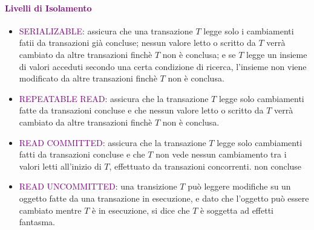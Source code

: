 \paragraph{\textcolor{purple}{Livelli di Isolamento}}
\begin{itemize}
    \item \textcolor{purple}{SERIALIZABLE}: assicura che una transazione $T$ legge solo
        i cambiamenti fatii da transazioni già concluse; nessun valore letto o scritto da $T$
        verrà cambiato da altre transazioni finchè $T$ non è conclusa; e se $T$ legge un insieme
        di valori acceduti secondo una certa condizione di ricerca, l'insieme non viene
        modificato da altre transazioni finchè $T$ non è conclusa.
    \item \textcolor{purple}{REPEATABLE READ}: assicura che la transazione $T$ legge solo cambiamenti
        fatte da transazioni concluse e che nessun valore letto o scritto da $T$
        verrà cambiato da altre transazioni finchè $T$ non è conclusa.
    \item \textcolor{purple}{READ COMMITTED}: assicura che la transazione $T$ legge solo cambiamenti
        fatti da transazioni concluse e che $T$ non vede nessun cambiamento tra i valori letti
        all'inizio di $T$, effettuato da transazioni concorrenti.
        non concluse
    \item \textcolor{purple}{READ UNCOMMITTED}: una transizione $T$ può leggere modifiche
        su un oggetto fatte da una transazione in esecuzione, e dato che l'oggetto può
        essere cambiato mentre $T$ è in esecuzione, si dice che $T$ è soggetta ad effetti fantasma.
\end{itemize}
